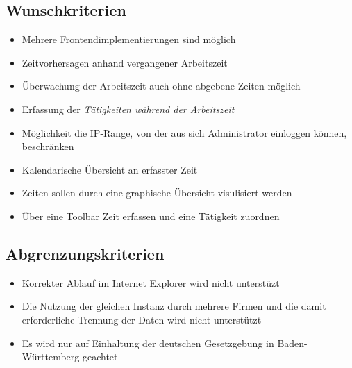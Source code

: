 \subsection{Wunschkriterien}

\begin{itemize}
	\item Mehrere Frontendimplementierungen sind möglich
	\item Zeitvorhersagen anhand vergangener Arbeitszeit
	\item Überwachung der Arbeitszeit auch ohne abgebene Zeiten möglich
	\item Erfassung der \em{Tätigkeiten} während der Arbeitszeit
	\item Möglichkeit die IP-Range, von der aus sich Administrator einloggen können, beschränken
	\item Kalendarische Übersicht an erfasster Zeit
	\item Zeiten sollen durch eine graphische Übersicht visulisiert werden
	\item Über eine Toolbar Zeit erfassen und eine Tätigkeit zuordnen
\end{itemize}


\subsection{Abgrenzungskriterien}
\begin{itemize}
	\item Korrekter Ablauf im Internet Explorer wird nicht unterstüzt
	\item Die Nutzung der gleichen Instanz durch mehrere Firmen und die damit erforderliche Trennung der Daten wird nicht unterstützt
	\item Es wird nur auf Einhaltung der deutschen Gesetzgebung in Baden-Württemberg geachtet
\end{itemize}

